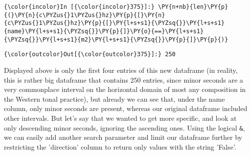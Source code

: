     \begin{Verbatim}[commandchars=\\\{\}]
{\color{incolor}In [{\color{incolor}375}]:} \PY{n+nb}{len}\PY{p}{(}\PY{n}{c\PYZus{}1\PYZus{}hz}\PY{p}{[}\PY{n}{c\PYZus{}1\PYZus{}hz}\PY{p}{[}\PY{l+s+s1}{\PYZsq{}}\PY{l+s+s1}{name}\PY{l+s+s1}{\PYZsq{}}\PY{p}{]}\PY{o}{==}\PY{l+s+s1}{\PYZsq{}}\PY{l+s+s1}{m2}\PY{l+s+s1}{\PYZsq{}}\PY{p}{]}\PY{p}{)}
\end{Verbatim}
\begin{Verbatim}[commandchars=\\\{\}]
{\color{outcolor}Out[{\color{outcolor}375}]:} 250
\end{Verbatim}
    Displayed above is only the first four entries of this new dataframe (in
reality, this is rather big dataframe that contains 250 entries, since
minor seconds are a very commonplace interval on the horizontal domain
of most any composition in the Western tonal practice), but already we
can see that, under the name column, only minor seconds are present,
whereas our original dataframe included other intervals. But let's say
that we wanted to get more specific, and look at only descending minor
seconds, ignoring the ascending ones. Using the logical \texttt{\&}, we
can easily add another search parameter and limit our dataframe further
by restricting the 'direction' column to return only values with the
string 'False'.


